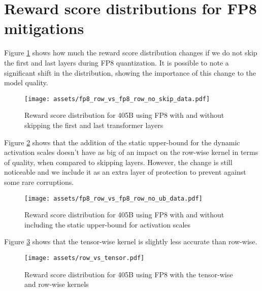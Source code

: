 \section{Reward score distributions for FP8 mitigations}
\label{section:fp8appendix}

Figure \ref{figure:reward-skip} shows how much the reward score distribution changes if we do not skip the first and last layers during FP8 quantization. It is possible to note a significant shift in the distribution, showing the importance of this change to the model quality.

\begin{figure}[t]
\centering
\texttt{[image: assets/fp8\_row\_vs\_fp8\_row\_no\_skip\_data.pdf]}
\caption{Reward score distribution for 405B using FP8 with and without skipping the first and last transformer layers}
\label{figure:reward-skip}
\end{figure}

Figure \ref{figure:reward-ub} shows that the addition of the static upper-bound for the dynamic activation scales doesn't have as big of an impact on the row-wise kernel in terms of quality, when compared to skipping layers. However, the change is still noticeable and we include it as an extra layer of protection to prevent against some rare corruptions.

\begin{figure}[t]
\centering
\texttt{[image: assets/fp8\_row\_vs\_fp8\_row\_no\_ub\_data.pdf]}
\caption{Reward score distribution for 405B using FP8 with and without including the static upper-bound for activation scales}
\label{figure:reward-ub}
\end{figure}

Figure \ref{figure:reward-tensor} shows that the tensor-wise kernel is slightly less accurate than row-wise.

\begin{figure}[t]
\centering
\texttt{[image: assets/row\_vs\_tensor.pdf]}
\caption{Reward score distribution for 405B using FP8 with the tensor-wise and row-wise kernels}
\label{figure:reward-tensor}
\end{figure}
